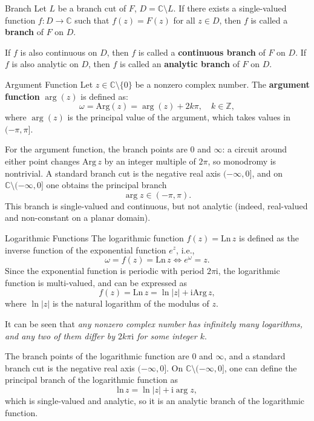 \begin{definition}{Branch}
    Let \(L\) be a branch cut of \(F\), \(D=\mathbb{C} \setminus L\).
    If there exists a single-valued function \(f: D \to \mathbb{C}\) such that
    \(f(z) = F(z)\) for all \(z \in D\), then \(f\) is called a \textbf{branch} of \(F\) on \(D\).

    If \(f\) is also continuous on \(D\), then \(f\) is called a \textbf{continuous branch} of \(F\) on \(D\).
    If \(f\) is also analytic on \(D\), then \(f\) is called an \textbf{analytic branch} of \(F\) on \(D\).
\end{definition}


\vspace{0.7cm}
\begin{definition}{Argument Function}
    Let \(z\in \mathbb{C} \setminus \{0\}\) be a nonzero complex number. 
    The \textbf{argument function} \(\arg(z)\) is defined as:
    \[
    \omega = \mathrm{Arg} (z) = \arg(z) + 2k\pi, \quad k \in \mathbb{Z},
    \]
    where \(\arg(z)\) is the principal value of the argument, which takes values in \((-\pi, \pi]\).
\end{definition}



For the argument function, the branch points are \(0\) and \(\infty\): 
a circuit around either point changes \(\mathrm{Arg}\, z\) by an integer multiple of \(2\pi\), 
so monodromy is nontrivial. 
A standard branch cut is the negative real axis \(( -\infty, 0 ]\), 
and on \(\mathbb{C} \setminus ( -\infty, 0 ]\) one obtains the principal branch
\[
\arg z \in (-\pi, \pi).
\]
This branch is single-valued and continuous, but not analytic (indeed, real-valued and non-constant on a planar domain).


\vspace{0.7cm}
\begin{definition}{Logarithmic Functions}
    The logarithmic function \(f(z) = \mathrm{Ln}\, z\) is defined as the inverse function of the exponential function \(e^z\), i.e., 
    \[
    \omega = f(z) = \mathrm{Ln}\, z \iff e^{\omega} = z.
    \]
    Since the exponential function is periodic with period \(2\pi \mathrm{i}\), the logarithmic function is multi-valued, 
    and can be expressed as
    \[
    f(z) = \mathrm{Ln}\, z = \ln |z| + \mathrm{i} \mathrm{Arg}\, z,
    \]
    where \(\ln |z|\) is the natural logarithm of the modulus of \(z\).
\end{definition}
It can be seen that \emph{any nonzero complex number has infinitely many logarithms,
and any two of them differ by \(2k\pi \mathrm{i}\) for some integer \(k\)}.

The branch points of the logarithmic function are \(0\) and \(\infty\),
and a standard branch cut is the negative real axis \(( -\infty, 0 ]\).
On \(\mathbb{C} \setminus ( -\infty, 0 ]\), one can define the principal branch of the logarithmic function as
\[
\mathrm{ln}\, z = \ln |z| + \mathrm{i} \arg z,
\]
which is single-valued and analytic, so it is an analytic branch of the logarithmic function.